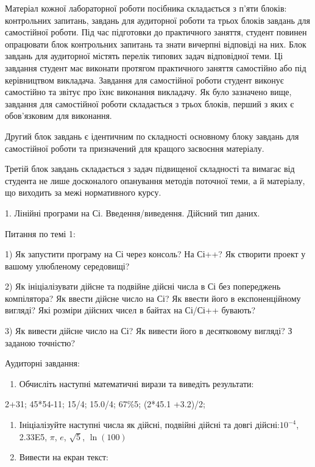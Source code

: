 \documentclass[]{article}
\begin{document}
Матеріал кожної лабораторної роботи посібника складається з п'яти
блоків: контрольних запитань, завдань для аудиторної роботи та трьох
блоків завдань для самостійної роботи. Під час підготовки до практичного
заняття, студент повинен опрацювати блок контрольних запитань та знати
вичерпні відповіді на них. Блок завдань для аудиторної містять перелік
типових задач відповідної теми. Ці завдання студент має виконати
протягом практичного заняття самостійно або під керівництвом викладача.
Завдання для самостійної роботи студент виконує самостійно та звітує про
їхнє виконання викладачу. Як було зазначено вище, завдання для
самостійної роботи складається з трьох блоків, перший з яких є
обов'язковим для виконання.

Другий блок завдань є ідентичним по складності основному блоку завдань
для самостійної роботи та призначений для кращого засвоєння матеріалу.

Третій блок завдань складається з задач підвищеної складності та вимагає
від студента не лише досконалого опанування методів поточної теми, а й
матеріалу, що виходить за межі нормативного курсу.

1. Лінійні програми на Сі. Введення/виведення. Дійсний тип даних.

Питання по темі 1:

1) Як запустити програму на Сі через консоль? На Сі++? Як створити
проект у вашому улюбленому середовищі?

2) Як ініціалізувати дійсне та подвійне дійсні числа в Сі без
попереджень компілятора? Як ввести дійсне число на Сі? Як ввести його в
експоненційному вигляді? Які розміри дійсних чисел в байтах на Сі/Сі++
бувають?

3) Як вивести дійсне число на Сі? Як вивести його в десятковому вигляді?
З заданою точністю?

Аудиторні завдання:

\begin{enumerate}
\def\labelenumi{\arabic{enumi}.}
\item
  Обчисліть наступні математичні вирази та виведіть результати:
\end{enumerate}

2+31; 45*54-11; 15/4; 15.0/4; 67\%5; (2*45.1 +3.2)/2;

\begin{enumerate}
\def\labelenumi{\arabic{enumi}.}
\item
  Ініціалізуйте наступні числа як дійсні, подвійні дійсні та довгі
  дійсні:\(10^{- 4}\), 2.33E5, \(\pi\), \(e\), \(\sqrt{5}\),
  \(\ln(100)\)
\item
  Вивести на екран текст:
\end{enumerate}
\end{document}
